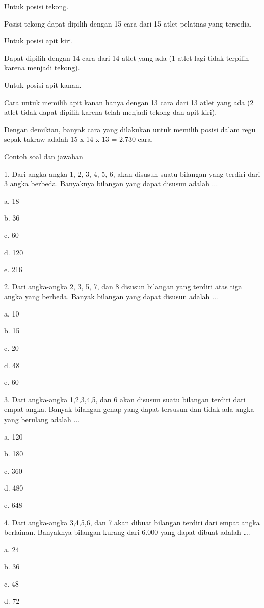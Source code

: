 \documentclass[11pt,fleqn]{book} %
\begin{document}
Untuk posisi tekong.

Posisi tekong dapat dipilih dengan 15 cara dari 15 atlet pelatnas yang tersedia.

Untuk posisi apit kiri.

Dapat dipilih dengan 14 cara dari 14 atlet yang ada (1 atlet lagi tidak terpilih karena menjadi tekong).

Untuk posisi apit kanan.

Cara untuk memilih apit kanan hanya dengan 13 cara dari 13 atlet yang ada (2 atlet tidak dapat dipilih karena telah menjadi tekong dan apit kiri).

Dengan demikian, banyak cara yang dilakukan untuk memilih posisi dalam regu sepak takraw adalah 15 x 14 x 13 = 2.730 cara.

 
Contoh soal dan jawaban

1. Dari angka-angka 1, 2, 3, 4, 5, 6, akan disusun suatu bilangan yang terdiri dari 3 angka berbeda. Banyaknya bilangan yang dapat disusun adalah ... 

a.	18

b.	36

c.	60

d.	120

e.	216



2. Dari angka-angka 2, 3, 5, 7, dan 8 disusun bilangan yang terdiri atas tiga angka yang berbeda. Banyak bilangan yang dapat disusun adalah ... 

a.	10

b.	15

c.	20

d.	48

e.	60


3. Dari angka-angka 1,2,3,4,5, dan 6 akan disusun suatu bilangan terdiri dari empat angka. Banyak bilangan genap yang dapat tersusun dan tidak ada angka yang berulang adalah ... 

a.	120

b.	180

c.	360

d.	480

e.	648 


4. Dari angka-angka 3,4,5,6, dan 7 akan dibuat bilangan terdiri dari empat angka berlainan. Banyaknya bilangan kurang dari 6.000 yang dapat dibuat adalah …. 

a.	24

b.	36

c.	48

d.	72
\end{document}
